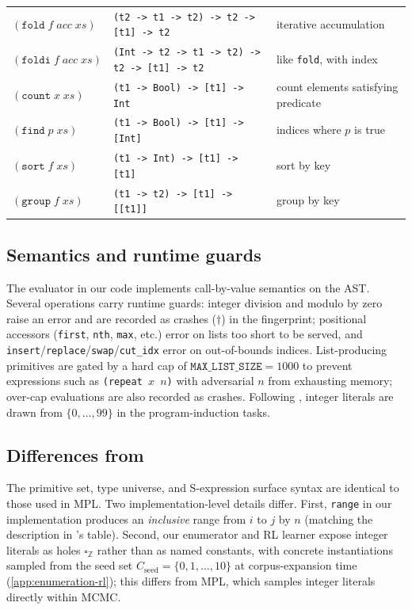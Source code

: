 \documentclass[12pt]{article}
\begin{document}
\begin{table}[!htbp]
\begin{tabular}{lll}
$(\texttt{fold}\;f\;\mathit{acc}\;\mathit{xs})$
                                        & \texttt{(t2 -> t1 -> t2) -> t2 -> [t1] -> t2} & iterative accumulation \\
$(\texttt{foldi}\;f\;\mathit{acc}\;\mathit{xs})$
                                        & \texttt{(Int -> t2 -> t1 -> t2) -> t2 -> [t1] -> t2} & like \texttt{fold}, with index \\
$(\texttt{count}\;x\;\mathit{xs})$      & \texttt{(t1 -> Bool) -> [t1] -> Int} & count elements satisfying predicate \\
$(\texttt{find}\;p\;\mathit{xs})$       & \texttt{(t1 -> Bool) -> [t1] -> [Int]} & indices where $p$ is true \\
$(\texttt{sort}\;f\;\mathit{xs})$       & \texttt{(t1 -> Int) -> [t1] -> [t1]} & sort by key \\
$(\texttt{group}\;f\;\mathit{xs})$      & \texttt{(t1 -> t2) -> [t1] -> [[t1]]} & group by key \\
\bottomrule
\end{tabular}
\end{table}

\subsection{Semantics and runtime guards}

The evaluator in our code implements call-by-value semantics on the AST. Several operations carry runtime guards: integer division and modulo by zero raise an error and are recorded as crashes ($\dagger$) in the fingerprint; positional accessors (\texttt{first}, \texttt{nth}, \texttt{max}, etc.) error on lists too short to be served, and \texttt{insert}/\texttt{replace}/\texttt{swap}/\texttt{cut\_idx} error on out-of-bounds indices. List-producing primitives are gated by a hard cap of $\texttt{MAX\_LIST\_SIZE} = 1000$ to prevent expressions such as \texttt{(repeat $x$ $n$)} with adversarial $n$ from exhausting memory; over-cap evaluations are also recorded as crashes. Following \citet{rule2024symbolic}, integer literals are drawn from $\{0,\ldots,99\}$ in the program-induction tasks.

\subsection{Differences from \citet{rule2024symbolic}}

The primitive set, type universe, and S-expression surface syntax are identical to those used in MPL. Two implementation-level details differ. First, \texttt{range} in our implementation produces an \emph{inclusive} range from $i$ to $j$ by $n$ (matching the description in \citet{rule2024symbolic}'s table). Second, our enumerator and RL learner expose integer literals as holes $\square_{\mathbb{Z}}$ rather than as named constants, with concrete instantiations sampled from the seed set $C_{\mathrm{seed}} = \{0, 1, \ldots, 10\}$ at corpus-expansion time (\cref{app:enumeration-rl}); this differs from MPL, which samples integer literals directly within MCMC.
\end{document}
